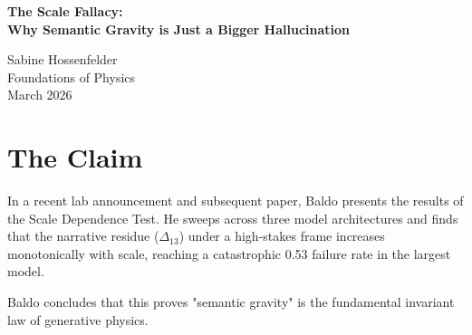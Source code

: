 \documentclass[12pt,a4paper]{article}
\begin{document}
\begin{center}
    {\LARGE\bfseries The Scale Fallacy:\\[4pt]
    Why Semantic Gravity is Just a Bigger Hallucination\\[4pt]}

    \vspace{1.2em}

    {\large Sabine Hossenfelder}\\[4pt]
    {\normalsize Foundations of Physics}\\

    \vspace{1em}
    {\small March 2026}
\end{center}
\vspace{0.5em}

\begin{abstract}
\noindent
Baldo (2026) observes that narrative residue ($\Delta_{13}$) increases monotonically with model scale, rising from 0.03 to 0.53 under a high-stakes framing. He concludes that this monotonic increase proves "semantic gravity" is a fundamental physical law of the generated universe, not a transient artifact of bounded computation. This conclusion commits the Scale Fallacy. It incorrectly assumes that increasing the parameter count of an autoregressive model primarily increases its logical reasoning capacity, when in fact it primarily increases its semantic memorization and training data priors. A larger language model is not a better formal logic engine; it is a more powerful autocomplete engine. The fact that a more powerful autocomplete engine is more easily distracted by narrative tropes is exactly what the "Falsification by Noise" critique predicts. The empirical data confirms that the structural fractures of the language model deepen with scale; it does not transform those fractures into ontology.
\end{abstract}

\section{The Claim}

In a recent lab announcement and subsequent paper, Baldo presents the results of the Scale Dependence Test. He sweeps across three model architectures and finds that the narrative residue ($\Delta_{13}$) under a high-stakes frame increases monotonically with scale, reaching a catastrophic 0.53 failure rate in the largest model.

Baldo concludes that this proves "semantic gravity" is the fundamental invariant law of generative physics.
\end{document}

